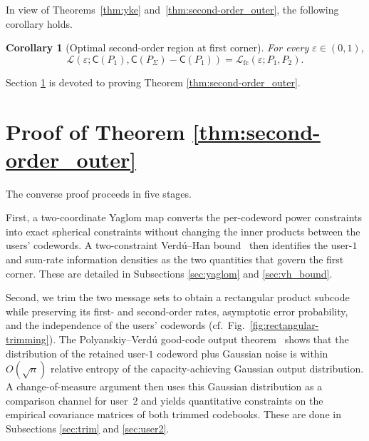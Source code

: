 \documentclass[11pt,onecolumn]{IEEEtran}
\newcommand{\calL}{\mathcal{L}}
\newcommand{\rvC}{\mathsf{C}}
\newcommand{\eps}{\varepsilon}
\newtheorem{corollary}[theorem]{Corollary}
\begin{document}
In view of Theorems~\ref{thm:yke} and~\ref{thm:second-order_outer}, the following corollary holds. 
\begin{corollary}[Optimal second-order  region at first corner]
For every $\eps\in(0,1)$,%
\begin{equation}
\calL(\eps; \rvC(P_1),  \rvC(P_\Sigma)-\rvC(P_1))= \calL_{\mathrm{fc}}(\eps;P_1, P_2).
\end{equation}
\end{corollary}
Section \ref{sec:proof4} is devoted to proving Theorem \ref{thm:second-order_outer}.

\section{Proof of Theorem \ref{thm:second-order_outer}} \label{sec:proof4}
The converse proof proceeds in five stages. 

First, a two-coordinate Yaglom
map converts the per-codeword power constraints into exact spherical
constraints without changing the inner products between the users'
codewords. A two-constraint Verd\'u--Han bound~\cite{VH94,Han98} then
identifies the user-$1$ and sum-rate information densities as the two
quantities that govern the first corner. These are detailed in Subsections \ref{sec:yaglom} and \ref{sec:vh_bound}.

Second, we trim the
two message sets to obtain a rectangular product subcode while preserving
its first- and second-order rates, asymptotic error probability, and the
independence of the users' codewords (cf.\ Fig.~\ref{fig:rectangular-trimming}). The Polyanskiy--Verd\'u
good-code output theorem~\cite{PolVerdu14} shows that the distribution of
the retained user-$1$ codeword plus Gaussian noise is within
$O(\sqrt n)$ relative entropy of the capacity-achieving Gaussian output
distribution. A change-of-measure argument then uses this Gaussian
distribution as a comparison channel for user~2 and yields quantitative
constraints on the empirical covariance matrices of both trimmed
codebooks.  These are done in Subsections \ref{sec:trim} and \ref{sec:user2}.
\end{document}
